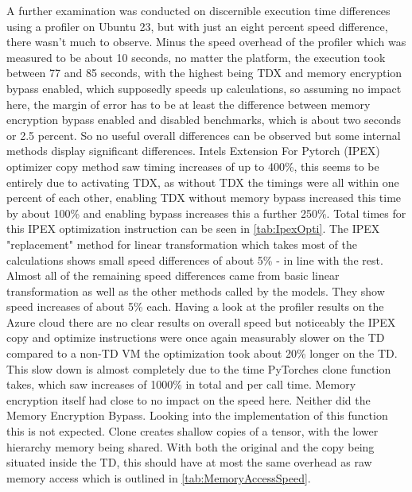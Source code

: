 A further examination was conducted on discernible execution time differences using a profiler on Ubuntu 23, but with just an eight percent speed difference, there wasn't much to observe.  Minus the speed overhead of the profiler which was measured to be about 10 seconds, no matter the platform, the execution took between 77 and 85 seconds, with the highest being TDX and memory encryption bypass enabled, which supposedly speeds up calculations, so assuming no impact here, the margin of error has to be at least the difference between memory encryption bypass enabled and disabled benchmarks, which is about two seconds or 2.5 percent. So no useful overall differences can be observed but some internal methods display significant differences. Intels Extension For Pytorch (IPEX) optimizer copy method saw timing increases of up to 400\%, this seems to be entirely due to activating TDX, as without TDX the timings were all within one percent of each other, enabling TDX without memory bypass increased this time by about 100\% and enabling bypass increases this a further 250\%. Total times for this IPEX optimization instruction can be seen in \ref{tab:IpexOpti}. The IPEX "replacement" method for linear transformation which takes most of the calculations shows small speed differences of about 5\% - in line with the rest. Almost all of the remaining speed differences came from basic linear transformation as well as the other methods called by the models. They show speed increases of about 5\% each.
Having a look at the profiler results on the Azure cloud there are no clear results on overall speed but noticeably the IPEX copy and optimize instructions were once again measurably slower on the TD compared to a non-TD VM the optimization took about 20\% longer on the TD. This slow down is almost completely due to the time PyTorches clone function takes, which saw increases of 1000\% in total and per call time. Memory encryption itself had close to no impact on the speed here. Neither did the Memory Encryption Bypass. Looking into the implementation of this function this is not expected. Clone creates shallow copies of a tensor, with the lower hierarchy memory being shared. With both the original and the copy being situated inside the TD, this should have at most the same overhead as raw memory access which is outlined in \ref{tab:MemoryAccessSpeed}.
\begin{table}
\centering
{}
\caption{Comparison of different timings of IPEX optimization method}
\label{tab:IpexOpti}
\end{table}

